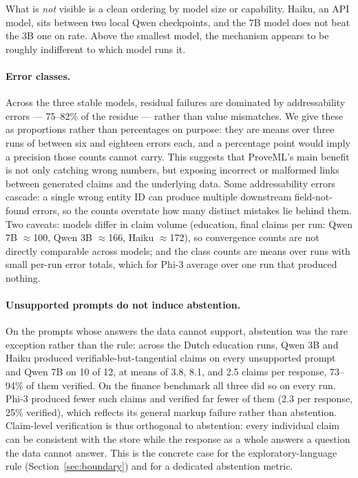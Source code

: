 \documentclass[11pt,a4paper]{article}
\begin{document}
\noindent What is \textit{not} visible is a clean ordering by model size or capability. Haiku, an API model, sits between two local Qwen checkpoints, and the 7B model does not beat the 3B one on rate. Above the smallest model, the mechanism appears to be roughly indifferent to which model runs it.

\paragraph{Error classes.} Across the three stable models, residual failures are dominated by addressability errors --- 75--82\% of the residue --- rather than value mismatches. We give these as proportions rather than percentages on purpose: they are means over three runs of between six and eighteen errors each, and a percentage point would imply a precision those counts cannot carry. This suggests that ProveML's main benefit is not only catching wrong numbers, but exposing incorrect or malformed links between generated claims and the underlying data. Some addressability errors cascade: a single wrong entity ID can produce multiple downstream field-not-found errors, so the counts overstate how many distinct mistakes lie behind them. Two caveats: models differ in claim volume (education, final claims per run: Qwen 7B $\approx$100, Qwen 3B $\approx$166, Haiku $\approx$172), so convergence counts are not directly comparable across models; and the class counts are means over runs with small per-run error totals, which for Phi-3 average over one run that produced nothing.

\paragraph{Unsupported prompts do not induce abstention.} On the prompts whose answers the data cannot support, abstention was the rare exception rather than the rule: across the Dutch education runs, Qwen 3B and Haiku produced verifiable-but-tangential claims on every unsupported prompt and Qwen 7B on 10 of 12, at means of 3.8, 8.1, and 2.5 claims per response, 73--94\% of them verified. On the finance benchmark all three did so on every run. Phi-3 produced fewer such claims and verified far fewer of them (2.3 per response, 25\% verified), which reflects its general markup failure rather than abstention. Claim-level verification is thus orthogonal to abstention: every individual claim can be consistent with the store while the response as a whole answers a question the data cannot answer. This is the concrete case for the exploratory-language rule (Section~\ref{sec:boundary}) and for a dedicated abstention metric.
\end{document}
